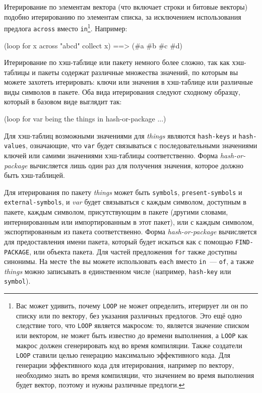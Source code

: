 Итерирование по элементам вектора (что включает строки и битовые векторы) подобно
итерированию по элементам списка, за исключением использования предлога \lstinline{across}
вместо \lstinline{in}\footnote{Вас может удивить, почему \lstinline{LOOP} не может определить,
  итерирует ли он по списку или по вектору, без указания различных предлогов. Это ещё одно
  следствие того, что \lstinline{LOOP} является макросом: то, является значение списком или
  вектором, не может быть известно до времени выполнения, а \lstinline{LOOP} как макрос
  должен сгенерировать код во время компиляции. Также создатели \lstinline{LOOP} ставили
  целью генерацию максимально эффективного кода. Для генерации эффективного кода для
  итерирования, например по вектору, необходимо знать во время компиляции, что значением
  во время выполнения будет вектор, поэтому и нужны различные предлоги.}\hspace{\footnotenegspace}. Например:

\begin{myverb}
(loop for x across "abcd" collect x) ==> (#\bslash{}a #\bslash{}b #\bslash{}c #\bslash{}d)
\end{myverb}

Итерирование по хэш-таблице или пакету немного более сложно, так как хэш-таблицы и пакеты
содержат различные множества значений, по которым вы можете захотеть итерировать: ключи
или значения в хэш-таблице или различные виды символов в пакете. Оба вида итерирования
следуют сходному образцу, который в базовом виде выглядит так:

\begin{myverb}
(loop for var being the things in hash-or-package ...)
\end{myverb}

Для хэш-таблиц возможными значениями для \textit{things} являются \lstinline{hash-keys} и
\lstinline{hash-values}, означающие, что \lstinline{var} будет связываться с последовательными
значениями ключей или самими значениями хэш-таблицы соответственно. Форма
\textit{hash-or-package} вычисляется лишь один раз для получения значения, которое должно
быть хэш-таблицей.

Для итерирования по пакету \textit{things} может быть \lstinline{symbols},
\lstinline{present-symbols} и \lstinline{external-symbols}, и \textit{var} будет связываться с
каждым символом, доступным в пакете, каждым символом, присутствующим в пакете (другими
словами, интернированным или импортированным в этот пакет), или с каждым символом,
экспортированным из пакета соответственно. Форма \textit{hash-or-package} вычисляется для
предоставления имени пакета, который будет искаться как с помощью \lstinline{FIND-PACKAGE},
или объекта пакета. Для частей предложения \lstinline{for} также доступны синонимы. На месте
\lstinline{the} вы можете использовать \lstinline{each} вместо \lstinline{in}~--- \lstinline{of}, а также
\textit{things} можно записывать в единственном числе (например, \lstinline{hash-key} или
\lstinline{symbol}).


